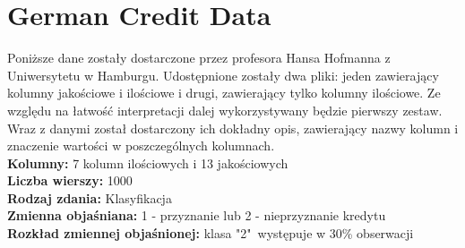 \documentclass[pl]{minipw} %
\begin{document}
\section{German Credit Data}
Poniższe dane zostały dostarczone przez profesora Hansa Hofmanna z Uniwersytetu w Hamburgu. Udostępnione zostały dwa pliki: jeden zawierający kolumny jakościowe i ilościowe i drugi, zawierający tylko kolumny ilościowe. Ze względu na łatwość interpretacji dalej wykorzystywany będzie pierwszy zestaw.
Wraz z danymi został dostarczony ich dokładny opis, zawierający nazwy kolumn i znaczenie wartości w poszczególnych kolumnach. \\
\textbf{Kolumny:} 7 kolumn ilościowych i 13 jakościowych \\
\textbf{Liczba wierszy:} 1000 \\
\textbf{Rodzaj zdania:} Klasyfikacja \\
\textbf{Zmienna objaśniana:} 1 - przyznanie lub 2 - nieprzyznanie kredytu \\
\textbf{Rozkład zmiennej objaśnionej:} klasa "2"\ występuje w 30\% obserwacji \\

\end{document}
